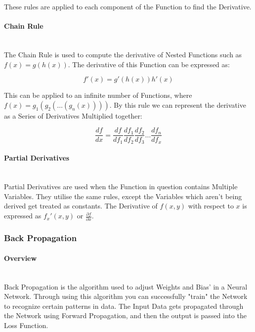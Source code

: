 \begin{flushleft}
                    These rules are applied to each component of the Function to find the Derivative. 

                \paragraph{Chain Rule}  \mbox{} \\
                    \vspace{0.2cm}
                    The Chain Rule is used to compute the derivative of Nested Functions such as $f(x) = g(h(x))$. The derivative of this Function can be expressed as: \\
                    \vspace{0.4cm}

                    \[f'(x) =  g'(h(x))h'(x)\]

                    \vspace{0.4cm}

                    This can be applied to an infinite number of Functions, where $f(x) = g_{1}(g_{2}(\hdots(g_{n}(x))))$. By this rule we can represent the derivative as
                    a Series of Derivatives Multiplied together:

                    \[
                        \frac{df}{dx} = \frac{df}{df_{1}} \frac{df_{1}}{df_{2}} \frac{df_{2}}{df_{3}} \hdots \frac{df_{n}}{df_{x}}
                    \]

                \paragraph{Partial Derivatives}  \mbox{} \\
                    \vspace{0.2cm}
                    Partial Derivatives are used when the Function in question contains Multiple Variables. They utilise the same rules, except the Variables
                    which aren't being derived get treated as constants. The Derivative of $f(x, y)$ with respect to $x$ is expressed as $f_{x}'(x,y)$ or 
                    {\Large $\frac{\partial f}{\partial x}$}. 
            \subsubsection{Back Propagation}
                \paragraph{Overview} \mbox{} \\
                    Back Propagation is the algorithm used to adjust Weights and Bias' in a Neural Network. Through using this algorithm you can successfully "train"
                    the Network to recognize certain patterns in data. The Input Data gets propagated through the Network using Forward Propagation, and then the output
                    is passed into the Loss Function.


\end{flushleft}
